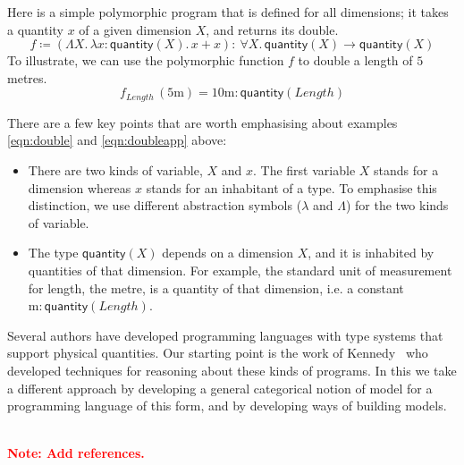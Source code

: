\documentclass[a4paper,UKenglish]{lipics}
\newcommand\note[1]{{ \bf \textcolor{red} {\vspace{2mm}\; \\ Note: #1\\}}}
\newcommand{\msf}[1]{\mathsf{#1}} %
\newcommand{\qnt}{\msf{quantity}}
\newcommand{\lengthDim}{\mathit{Length}}
\newcommand{\Dvar}{X}
\begin{document}
Here is a simple polymorphic program that is defined for all dimensions; it takes a quantity $x$ of a given dimension $X$, and returns its double.
\begin{equation}
f\coloneqq (\Lambda X.\,\lambda x:\qnt(X).\,x+x)
:\ \forall X.\,\qnt(X)\to \qnt(X)
\label{eqn:double}
\end{equation}
To illustrate, we can use the polymorphic function $f$ to double a length of $5$ metres.
\begin{equation}
f_\lengthDim\,(5\mathrm{m})=
10\mathrm{m}:\qnt(\lengthDim)
\label{eqn:doubleapp}
\end{equation}

\noindent There are a few key points that are worth emphasising about examples \eqref{eqn:double} and \eqref{eqn:doubleapp} above:
\begin{itemize}
\item There are two kinds of variable, $\Dvar$ and $x$. The first variable $\Dvar$ stands for a dimension whereas $x$ stands for an inhabitant of a type. To emphasise this distinction, we use different abstraction symbols ($\lambda$ and $\Lambda$) for the two kinds of variable.
\item The type $\qnt(\Dvar)$ depends on a dimension $\Dvar$, and it is inhabited by quantities of that dimension. For example, the standard unit of measurement for length, the metre, is a quantity of that dimension, i.e. a constant $\mathrm m:\qnt(\lengthDim)$.
\end{itemize}

Several authors have developed programming languages with type systems that support physical quantities. Our starting point is the work of Kennedy~\cite{Kennedy:1997:RPU:263699.263761} who developed techniques for reasoning about these kinds of programs. In this we take a different approach by developing a general categorical notion of model for a programming language of this form, and by developing ways of building models.

\note{Add references.}
\end{document}

